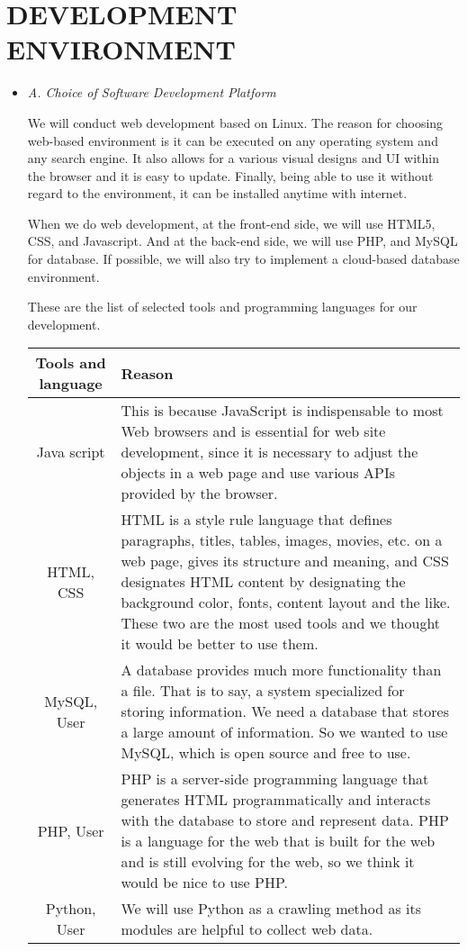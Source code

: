 \documentclass{scrartcl}
\begin{document}
\section{DEVELOPMENT ENVIRONMENT}
\begin{itemize}
\item 
\textit{A. Choice of Software Development Platform}

We will conduct web development based on Linux. The reason for choosing web-based environment is it can be executed on any operating system and any search engine. It also allows for a various visual designs and UI within the browser and it is easy to update. Finally, being able to use it without regard to the environment, it can be installed anytime with internet.

When we do web development, at the front-end side, we will use HTML5, CSS, and Javascript. And at the back-end side, we will use PHP, and MySQL for database. If possible, we will also try to implement a cloud-based database environment.

These are the list of selected tools and programming languages for our development.

   \begin{center}
    \begin{tabular}{|c|p{11cm}|}
    \hline
      Tools and language & Reason\\
    \hline
     Java script & This is because JavaScript is indispensable to most Web browsers and is essential for web site development, since it is necessary to adjust the objects in a web page and use various APIs provided by the browser. \\
    \hline
      HTML, CSS & HTML is a style rule language that defines paragraphs, titles, tables, images, movies, etc. on a web page, gives its structure and meaning, and CSS designates HTML content by designating the background color, fonts, content layout and the like. These two are the most used tools and we thought it would be better to use them.\\
    \hline
      MySQL, User & A database provides much more functionality than a file. That is to say, a system specialized for storing information. We need a database that stores a large amount of information. So we wanted to use MySQL, which is open source and free to use.\\
    \hline
      PHP, User & PHP is a server-side programming language that generates HTML programmatically and interacts with the database to store and represent data. PHP is a language for the web that is built for the web and is still evolving for the web, so we think it would be nice to use PHP.\\
    \hline
      Python, User & We will use Python as a crawling method as its modules are helpful to collect web data.\\
    \hline
    \end{tabular}
    \end{center}


\end{itemize}
\end{document}
